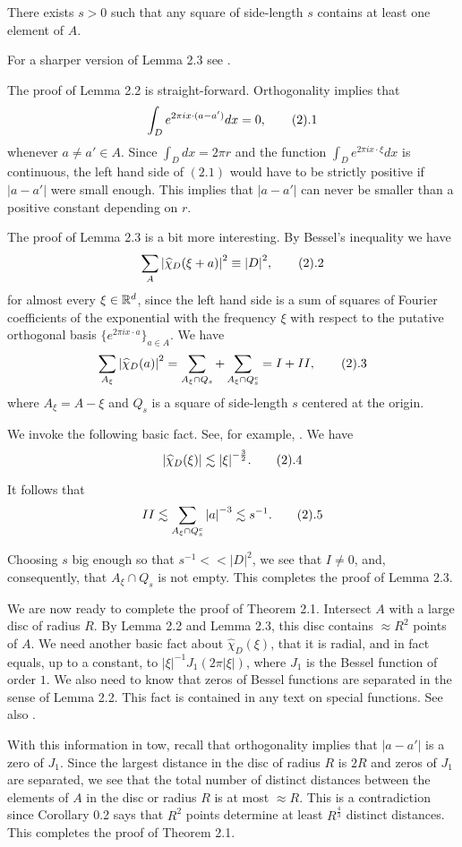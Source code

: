  There exists $s>0$ such that any square of
side-length $s$ contains at least one element of $A$. \endproclaim

For a sharper version of Lemma 2.3 see \cite{IP2000}.

The proof of Lemma 2.2 is straight-forward. Orthogonality implies
that
$$ \int_D e^{2 \pi i x \cdot (a-a')} dx=0, \tag2.1$$ whenever $a
\not=a' \in A$. Since $\int_D dx=2 \pi r$ and the function $\int_D
e^{2 \pi i x \cdot \xi}dx$ is continuous, the left hand side of
$(2.1)$ would have to be strictly positive if $|a-a'|$ were small
enough. This implies that $|a-a'|$ can never be smaller than a
positive constant depending on $r$.

The proof of Lemma 2.3 is a bit more interesting. By Bessel's
inequality we have
$$ \sum_A {|\widehat{\chi}_D(\xi+a)|}^2 \equiv {|D|}^2, \tag2.2$$ for
almost every $\xi \in {\Bbb R}^d$, since the left hand side is a
sum of squares of Fourier coefficients of the exponential with the
frequency $\xi$ with respect to the putative orthogonal basis
${\{e^{2 \pi i x \cdot a} \}}_{a \in A}$. We have
$$ \sum_{A_{\xi}} {|\widehat{\chi}_D(a)|}^2=\sum_{A_{\xi} \cap
Q_s} +\sum_{A_{\xi} \cap Q_s^c}=I+II, \tag2.3$$ where
$A_{\xi}=A-\xi$ and $Q_s$ is a square of side-length $s$ centered
at the origin.

We invoke the following basic fact. See, for example,
\cite{Stein93}. We have
$$ |\widehat{\chi}_D(\xi)| \lesssim {|\xi|}^{-\frac{3}{2}}. \tag2.4$$

It follows that
$$ II \lesssim  \sum_{A_{\xi} \cap Q_s^c} {|a|}^{-3} \lesssim s^{-1}.
\tag2.5$$

Choosing $s$ big enough so that $s^{-1}<<{|D|}^2$, we see that $I
\not=0$, and, consequently, that $A_{\xi} \cap Q_s$ is not empty.
This completes the proof of Lemma 2.3.

We are now ready to complete the proof of Theorem 2.1. Intersect
$A$ with a large disc of radius $R$. By Lemma 2.2 and Lemma 2.3,
this disc contains $\approx R^2$ points of $A$. We need another
basic fact about $\widehat{\chi}_D(\xi)$, that it is radial, and
in fact equals, up to a constant, to ${|\xi|}^{-1} J_1(2 \pi
|\xi|)$, where $J_1$ is the Bessel function of order $1$. We also
need to know that zeros of Bessel functions are separated in the
sense of Lemma 2.2. This fact is contained in any text on special
functions. See also \cite{SteinWeiss71}.

With this information in tow, recall that orthogonality implies
that $|a-a'|$ is a zero of $J_1$. Since the largest distance in
the disc of radius $R$ is $2R$ and zeros of $J_1$ are separated,
we see that the total number of distinct distances between the
elements of $A$ in the disc or radius $R$ is at most $\approx R$.
This is a contradiction since Corollary 0.2 says that $R^2$ points
determine at least $R^{\frac{4}{3}}$ distinct distances. This
completes the proof of Theorem 2.1.



